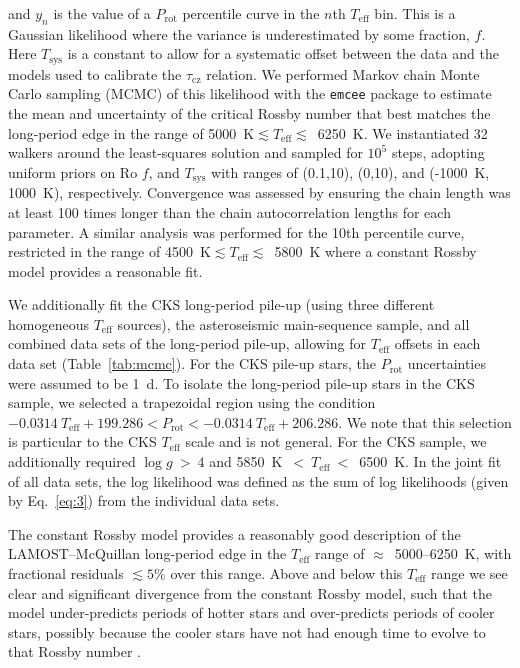 \documentclass[linenumbers,tighten,trackchanges,twocolumn]{aastex631}
\newcommand{\taucz}{$\tau_\mathrm{cz}$\xspace}
\newcommand{\lamostmcq}{LAMOST--McQuillan\xspace}
\newcommand{\teff}{\ensuremath{T_{\mathrm{eff}}}\xspace}
\newcommand{\logg}{\ensuremath{\log g}\xspace}
\newcommand{\prot}{\ensuremath{P_\mathrm{rot}}\xspace}
\begin{document}
and $y_n$ is the value of a \prot percentile curve in the $n$th \teff bin. This is a Gaussian likelihood where the variance is underestimated by some fraction, $f$. Here $T_\mathrm{sys}$ is a constant to allow for a systematic offset between the data and the models used to calibrate the \taucz relation. We performed Markov chain Monte Carlo sampling (MCMC) of this likelihood with the \texttt{emcee} package \citep{emcee2013, emcee2019} to estimate the mean and uncertainty of the critical Rossby number that best matches the long-period edge in the range of 5000~K$\lesssim \teff \lesssim$~6250~K. We instantiated 32 walkers around the least-squares solution and sampled for $10^5$ steps, adopting uniform priors on Ro $f$, and $T_\mathrm{sys}$ with ranges of (0.1,10), (0,10), and (-1000~K, 1000~K), respectively. Convergence was assessed by ensuring the chain length was at least 100 times longer than the chain autocorrelation lengths for each parameter. A similar analysis was performed for the 10th percentile curve, restricted in the range of 4500~K$\lesssim \teff \lesssim$~5800~K where a constant Rossby model provides a reasonable fit. 

We additionally fit the CKS long-period pile-up (using three different homogeneous \teff sources), the \citet{Hall2021} asteroseismic main-sequence sample, and all combined data sets of the long-period pile-up, allowing for \teff offsets in each data set (Table~\ref{tab:mcmc}). For the CKS pile-up stars, the \prot uncertainties were assumed to be 1~d. To isolate the long-period pile-up stars in the CKS sample, we selected a trapezoidal region using the condition $-0.0314~\teff + 199.286 < \prot < -0.0314~\teff + 206.286$. We note that this selection is particular to the CKS \teff scale and is not general. For the CKS sample, we additionally required $\logg~>~4$ and 5850~K~$<~\teff~<$~6500~K. In the joint fit of all data sets, the log likelihood was defined as the sum of log likelihoods (given by Eq.~\ref{eq:3}) from the individual data sets.

The constant Rossby model provides a reasonably good description of the \lamostmcq long-period edge in the \teff range of $\approx$~5000--6250~K, with fractional residuals $\lesssim5\%$ over this range. Above and below this \teff range we see clear and significant divergence from the constant Rossby model, such that the model under-predicts periods of hotter stars and over-predicts periods of cooler stars, possibly because the cooler stars have not had enough time to evolve to that Rossby number \citep[see Figure 6 in][]{vanSaders2019}.
\end{document}
